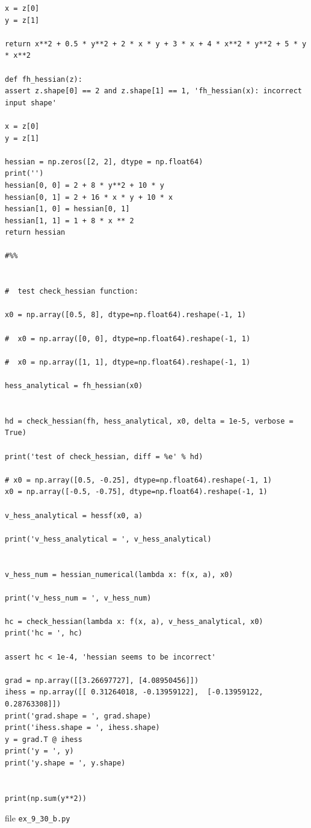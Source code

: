 \documentclass{article}
\begin{document}
\begin{verbatim}
x = z[0]
y = z[1]

return x**2 + 0.5 * y**2 + 2 * x * y + 3 * x + 4 * x**2 * y**2 + 5 * y * x**2

def fh_hessian(z):
assert z.shape[0] == 2 and z.shape[1] == 1, 'fh_hessian(x): incorrect input shape'

x = z[0]
y = z[1]

hessian = np.zeros([2, 2], dtype = np.float64)
print('')
hessian[0, 0] = 2 + 8 * y**2 + 10 * y
hessian[0, 1] = 2 + 16 * x * y + 10 * x
hessian[1, 0] = hessian[0, 1]
hessian[1, 1] = 1 + 8 * x ** 2
return hessian

#%%


#  test check_hessian function:

x0 = np.array([0.5, 8], dtype=np.float64).reshape(-1, 1)

#  x0 = np.array([0, 0], dtype=np.float64).reshape(-1, 1)

#  x0 = np.array([1, 1], dtype=np.float64).reshape(-1, 1)

hess_analytical = fh_hessian(x0)


hd = check_hessian(fh, hess_analytical, x0, delta = 1e-5, verbose = True)

print('test of check_hessian, diff = %e' % hd)

# x0 = np.array([0.5, -0.25], dtype=np.float64).reshape(-1, 1)    
x0 = np.array([-0.5, -0.75], dtype=np.float64).reshape(-1, 1)    

v_hess_analytical = hessf(x0, a)

print('v_hess_analytical = ', v_hess_analytical)


v_hess_num = hessian_numerical(lambda x: f(x, a), x0)

print('v_hess_num = ', v_hess_num)

hc = check_hessian(lambda x: f(x, a), v_hess_analytical, x0)
print('hc = ', hc)

assert hc < 1e-4, 'hessian seems to be incorrect'

grad = np.array([[3.26697727], [4.08950456]])    
ihess = np.array([[ 0.31264018, -0.13959122],  [-0.13959122,  0.28763308]])
print('grad.shape = ', grad.shape)
print('ihess.shape = ', ihess.shape)
y = grad.T @ ihess
print('y = ', y)
print('y.shape = ', y.shape)


print(np.sum(y**2))
\end{verbatim}	

file  \verb|ex_9_30_b.py|
\end{document}
